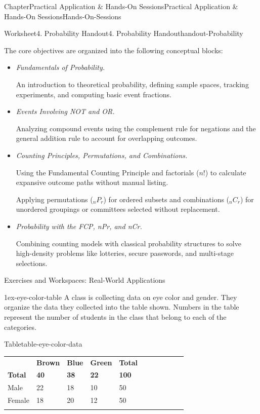 \documentclass[oneside,10pt,]{book}
\newcommand{\tabularfont}{\relax}
\newcommand{\ptxlistdisc}{\raisebox{0.3ex}{\textbullet}}
\newcommand{\lititle}[1]{{\slshape#1}}
\newcommand{\hrulethin}  {\noalign{\hrule height 0.04em}}
\begin{document}
\begin{chapterptx}{Chapter}{Practical Application \& Hands-On Sessions}{}{Practical Application \& Hands-On Sessions}{}{}{Hands-On-Sessions}
\begin{worksheet-section}{Worksheet}{4. Probability Handout}{}{4. Probability Handout}{}{}{handout-Probability}
\begin{introduction}{}
\par
The core objectives are organized into the following conceptual blocks:%
%
\begin{itemize}[label=\ptxlistdisc]
\item{}\lititle{Fundamentals of Probability.}\par%
An introduction to theoretical probability, defining sample spaces, tracking experiments, and computing basic event fractions.%
\item{}\lititle{Events Involving NOT and OR.}\par%
Analyzing compound events using the complement rule for negations and the general addition rule to account for overlapping outcomes.%
\item{}\lititle{Counting Principles, Permutations, and Combinations.}\par%
Using the Fundamental Counting Principle and factorials (\(n!\)) to calculate expansive outcome paths without manual listing.%
\par
Applying permutations (\(_nP_r\)) for ordered subsets and combinations (\(_nC_r\)) for unordered groupings or committees selected without replacement.%
\item{}\lititle{Probability with the FCP, nPr, and nCr.}\par%
Combining counting models with classical probability structures to solve high-density problems like lotteries, secure passwords, and multi-stage selections.%
\end{itemize}
\end{introduction}%
Exercises and Workspaces: Real-World Applications%
\begin{divisionexercise}{1}{}{}{ex-eye-color-table}%
A class is collecting data on eye color and gender. They organize the data they collected into the table shown. Numbers in the table represent the number of students in the class that belong to each of the categories.%
\begin{tableptx}{Table}{\textbf{}}{table-eye-color-data}{}%
\centering%
{\tabularfont%
\begin{tabular}{AlAlAlAlAlA}\hrulethin
{\bfseries{}}&{\bfseries{}Brown}&{\bfseries{}Blue}&{\bfseries{}Green}&{\bfseries{}Total}\tabularnewline\hrulethin
{\bfseries{}Total}&{\bfseries{}40}&{\bfseries{}38}&{\bfseries{}22}&{\bfseries{}100}\tabularnewline\hrulethin
Male&22&18&10&50\tabularnewline\hrulethin
Female&18&20&12&50\tabularnewline\hrulethin
\end{tabular}
}%
\end{tableptx}%

\end{divisionexercise}
\end{worksheet-section}
\end{chapterptx}
\end{document}
